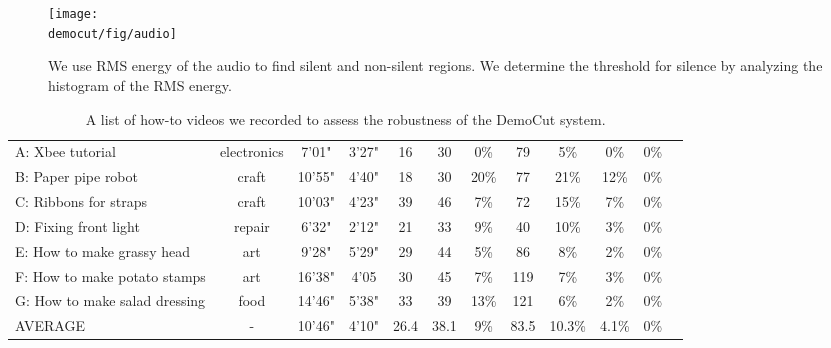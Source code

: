 \begin{figure}[t]
  \centering
\texttt{[image: \\democut/fig/audio]}
  \caption{We use RMS energy of the audio to find silent and non-silent regions. We determine the threshold for silence by analyzing the histogram of the RMS energy.}
  \label{fig:audio}
  \vspace{-0.15in}
\end{figure}


\begin{table*}
  \centering
  \small
  \begin{tabular}{|l*{11}{|c}|}
    \hline
     &
     &
     &
     &
     &
     &
     &
     &
     &
     &
     \\ \hline
    A: Xbee tutorial & electronics & 7'01" & 3'27" & 16 & 30 & 0\% & 79 & 5\% & 0\% & 0\% \\
    B: Paper pipe robot & craft & 10'55" & 4'40" & 18 & 30 & 20\% & 77 & 21\% & 12\% & 0\% \\
    C: Ribbons for straps & craft & 10'03" & 4'23" & 39 & 46 & 7\% & 72 & 15\% & 7\% & 0\% \\
    D: Fixing front light & repair & 6'32" & 2'12" & 21 & 33 & 9\% & 40 & 10\% & 3\% & 0\% \\
    E: How to make grassy head & art & 9'28" & 5'29" & 29 & 44 & 5\% & 86 & 8\% & 2\% & 0\% \\
    F: How to make potato stamps & art & 16'38" & 4'05 & 30 & 45 & 7\% & 119 & 7\% & 3\% & 0\% \\
    G: How to make salad dressing & food & 14'46" & 5'38" & 33 & 39 & 13\% & 121 & 6\% & 2\% & 0\% \\ \hline
    AVERAGE & - & 10'46" & 4'10" & 26.4 & 38.1 & 9\% & 83.5 & 10.3\% & 4.1\% & 0\% \\ \hline
  \end{tabular}
  \caption{A list of how-to videos we recorded to assess the robustness of the DemoCut system.}
  \label{tab:system_results}
  \vspace{-0.15in}
\end{table*}

